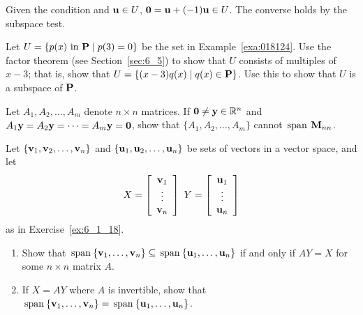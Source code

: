\begin{multicols}{2}
\begin{ex}
\begin{sol}
Given the condition and $\textbf{u} \in U$, $\textbf{0} = \textbf{u} + (-1)\textbf{u} \in U$. The converse holds by the subspace test.
\end{sol}
\end{ex}

\begin{ex}
Let $U = \{p(x) \mbox{ in } \textbf{P} \mid p(3) = 0\}$ be the set in
Example~\ref{exa:018124}. Use the factor theorem (see
Section~\ref{sec:6_5}) to show that $U$ consists of multiples of $x - 3$; that is, show that $U = \{(x - 3)q(x) \mid q(x) \in \textbf{P}\}$. Use this to show that $U$ is a subspace of $\textbf{P}$.
\end{ex}

\begin{ex}
Let $A_{1}, A_{2}, \dots, A_{m}$ denote $n \times n$ matrices. If $\textbf{0} \neq \textbf{y} \in \mathbb{R}^n$ and $A_{1}\textbf{y} = A_{2}\textbf{y} = \dots = A_{m}\textbf{y} = \textbf{0}$, show that $\{A_{1}, A_{2}, \dots, A_{m}\}$ cannot $\thinspace\operatorname{span\medspace} \textbf{M}_{nn}$.
\end{ex}

\begin{ex}
Let $\{\textbf{v}_{1}, \textbf{v}_{2}, \dots, \textbf{v}_{n}\}$ and $\{\textbf{u}_{1}, \textbf{u}_{2}, \dots, \textbf{u}_{n}\}$ be sets of vectors in a vector space, and let
\begin{equation*}
X = 
\left[ \begin{array}{c}
\textbf{v}_1 \\
\vdots \\
\textbf{v}_n
\end{array} \right]
\ Y =
\left[ \begin{array}{c}
\textbf{u}_1 \\
\vdots \\
\textbf{u}_n
\end{array} \right]
\end{equation*}
as in Exercise~\ref{ex:6_1_18}.

\begin{enumerate}[label={\alph*.}]
\item Show that $\thinspace\operatorname{span\medspace}\{\textbf{v}_{1}, \dots, \textbf{v}_{n}\} \subseteq \thinspace\operatorname{span\medspace}\{\textbf{u}_{1}, \dots, \textbf{u}_{n}\}$ if and only if $AY = X$ for some $n \times n$ matrix $A$.

\item If $X = AY$ where $A$ is invertible, show that $\thinspace\operatorname{span\medspace}\{\textbf{v}_{1}, \dots, \textbf{v}_{n}\} = \thinspace\operatorname{span\medspace}\{\textbf{u}_{1}, \dots, \textbf{u}_{n}\}$.


\end{enumerate}
\end{ex}
\end{multicols}
